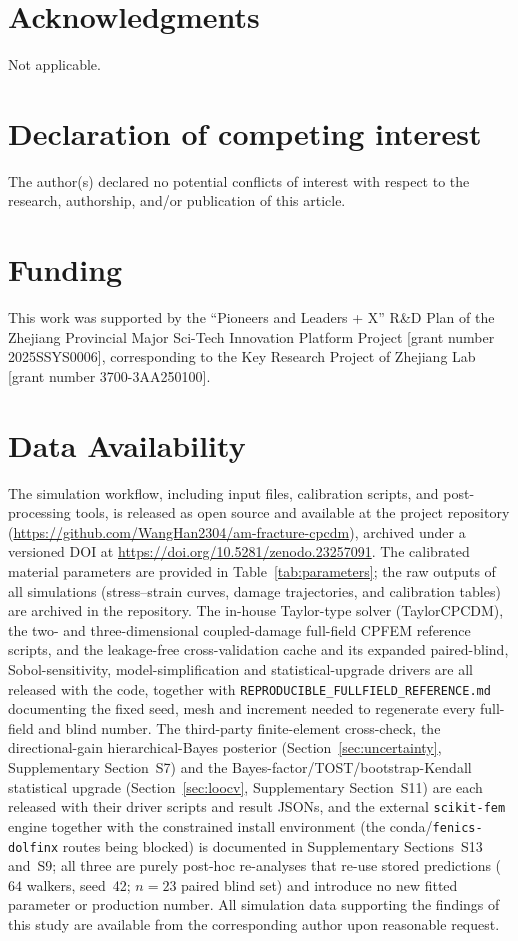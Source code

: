 \section*{Acknowledgments}

Not applicable.

\section*{Declaration of competing interest}

The author(s) declared no potential conflicts of interest with respect to the research, authorship, and/or publication of this article.

\section*{Funding}

This work was supported by the ``Pioneers and Leaders + X'' R\&D Plan of the Zhejiang Provincial Major Sci-Tech Innovation Platform Project [grant number 2025SSYS0006], corresponding to the Key Research Project of Zhejiang Lab [grant number 3700-3AA250100].

\section*{Data Availability}

The simulation workflow, including input files, calibration scripts, and post-processing tools, is released as open source and available at the project repository (\url{https://github.com/WangHan2304/am-fracture-cpcdm}), archived under a versioned DOI at \url{https://doi.org/10.5281/zenodo.23257091}. The calibrated material parameters are provided in Table~\ref{tab:parameters}; the raw outputs of all simulations (stress--strain curves, damage trajectories, and calibration tables) are archived in the repository. The in-house Taylor-type solver (TaylorCPCDM), the two- and three-dimensional coupled-damage full-field CPFEM reference scripts, and the leakage-free cross-validation cache and its expanded paired-blind, Sobol-sensitivity, model-simplification and statistical-upgrade drivers are all released with the code, together with \texttt{REPRODUCIBLE\_FULLFIELD\_REFERENCE.md} documenting the fixed seed, mesh and increment needed to regenerate every full-field and blind number. The third-party finite-element cross-check, the directional-gain hierarchical-Bayes posterior (Section~\ref{sec:uncertainty}, Supplementary Section~S7) and the Bayes-factor/TOST/bootstrap-Kendall statistical upgrade (Section~\ref{sec:loocv}, Supplementary Section~S11) are each released with their driver scripts and result JSONs, and the external \texttt{scikit-fem} engine together with the constrained install environment (the conda/\texttt{fenics-dolfinx} routes being blocked) is documented in Supplementary Sections~S13 and~S9; all three are purely post-hoc re-analyses that re-use stored predictions ($64$ walkers, seed~42; $n=23$ paired blind set) and introduce no new fitted parameter or production number. All simulation data supporting the findings of this study are available from the corresponding author upon reasonable request.

